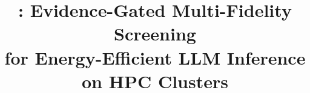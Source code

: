 \documentclass[conference]{IEEEtran}
\title{\LARGE \system{}: Evidence-Gated Multi-Fidelity Screening\\
for Energy-Efficient LLM Inference on HPC Clusters}
\author{\IEEEauthorblockN{Anonymous Authors}}
\begin{document}
\maketitle









\balance




\clearpage
\nobalance
\balance


\end{document}
